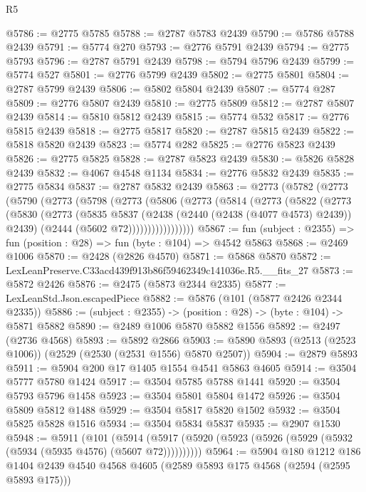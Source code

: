 \begin{lexlean}{R5}
\begin{coremodule}
@5786 := @2775 @5785
@5788 := @2787 @5783 @2439
@5790 := @5786 @5788 @2439
@5791 := @5774 @270
@5793 := @2776 @5791 @2439
@5794 := @2775 @5793
@5796 := @2787 @5791 @2439
@5798 := @5794 @5796 @2439
@5799 := @5774 @527
@5801 := @2776 @5799 @2439
@5802 := @2775 @5801
@5804 := @2787 @5799 @2439
@5806 := @5802 @5804 @2439
@5807 := @5774 @287
@5809 := @2776 @5807 @2439
@5810 := @2775 @5809
@5812 := @2787 @5807 @2439
@5814 := @5810 @5812 @2439
@5815 := @5774 @532
@5817 := @2776 @5815 @2439
@5818 := @2775 @5817
@5820 := @2787 @5815 @2439
@5822 := @5818 @5820 @2439
@5823 := @5774 @282
@5825 := @2776 @5823 @2439
@5826 := @2775 @5825
@5828 := @2787 @5823 @2439
@5830 := @5826 @5828 @2439
@5832 := @4067 @4548 @1134
@5834 := @2776 @5832 @2439
@5835 := @2775 @5834
@5837 := @2787 @5832 @2439
@5863 := @2773
    (@5782
      (@2773
        (@5790
          (@2773
            (@5798
              (@2773
                (@5806
                  (@2773
                    (@5814
                      (@2773
                        (@5822
                          (@2773
                            (@5830
                              (@2773
                                (@5835
                                  @5837
                                  (@2438 (@2440 (@2438 (@4077 @4573) @2439)) @2439)
                                  (@2444 (@5602 @72)))))))))))))))))
@5867 := fun (subject : @2355) => fun (position : @28) => fun (byte : @104) => @4542 @5863
@5868 := @2469 @1006
@5870 := @2428 (@2826 @4570)
@5871 := @5868 @5870
@5872 := LexLeanPreserve.C33acd439f913b86f59462349c141036e.R5.__fits_27
@5873 := @5872 @2426
@5876 := @2475 (@5873 @2344 @2335)
@5877 := LexLeanStd.Json.escapedPiece
@5882 := @5876 (@101 (@5877 @2426 @2344 @2335))
@5886 := (subject : @2355) -> (position : @28) -> (byte : @104) -> @5871 @5882
@5890 := @2489 @1006 @5870 @5882 @1556
@5892 := @2497 (@2736 @4568)
@5893 := @5892 @2866
@5903 := @5890 @5893 (@2513 (@2523 @1006)) (@2529 (@2530 (@2531 @1556) @5870 @2507))
@5904 := @2879 @5893
@5911 := @5904 @200 @17 @1405 @1554 @4541 @5863 @4605
@5914 := @3504 @5777 @5780 @1424
@5917 := @3504 @5785 @5788 @1441
@5920 := @3504 @5793 @5796 @1458
@5923 := @3504 @5801 @5804 @1472
@5926 := @3504 @5809 @5812 @1488
@5929 := @3504 @5817 @5820 @1502
@5932 := @3504 @5825 @5828 @1516
@5934 := @3504 @5834 @5837
@5935 := @2907 @1530
@5948 := @5911
    (@101 (@5914 (@5917 (@5920 (@5923 (@5926 (@5929 (@5932 (@5934 (@5935 @4576) (@5607 @72))))))))))
@5964 := @5904
    @180
    @1212
    @186
    @1404
    @2439
    @4540
    @4568
    @4605
    (@2589 @5893 @175 @4568 (@2594 (@2595 @5893 @175)))

\end{coremodule}
\end{lexlean}
